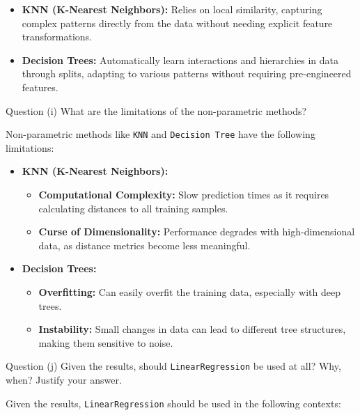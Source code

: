 \begin{itemize}
    \item \textbf{KNN (K-Nearest Neighbors):} Relies on local similarity, capturing complex patterns directly from the data without needing explicit feature transformations.
    \item \textbf{Decision Trees:} Automatically learn interactions and hierarchies in data through splits, adapting to various patterns without requiring pre-engineered features.
\end{itemize}


\begin{customboxnew}[label={box:Q3i}]{Question (i)}
	What are the limitations of the non-parametric methods?
\end{customboxnew}

Non-parametric methods like \texttt{KNN} and \texttt{Decision Tree} have the following limitations:

\begin{itemize}
    \item \textbf{KNN (K-Nearest Neighbors):}
    \begin{itemize}
        \item \textbf{Computational Complexity:} Slow prediction times as it requires calculating distances to all training samples.
        \item \textbf{Curse of Dimensionality:} Performance degrades with high-dimensional data, as distance metrics become less meaningful.
    \end{itemize}
    
    \item \textbf{Decision Trees:}
    \begin{itemize}
        \item \textbf{Overfitting:} Can easily overfit the training data, especially with deep trees.
        \item \textbf{Instability:} Small changes in data can lead to different tree structures, making them sensitive to noise.
    \end{itemize}
\end{itemize}

\begin{customboxnew}[label={box:Q3j}]{Question (j)}
	Given the results, should \verb|LinearRegression| be used at all? Why, when? Justify your answer.
\end{customboxnew}

Given the results, \verb|LinearRegression| should be used in the following contexts:

